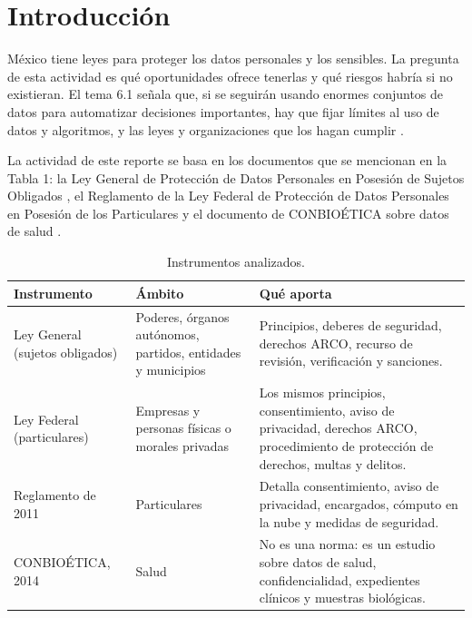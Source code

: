 \documentclass[11pt,letterpaper]{article}
\begin{document}
\portada
\indicegeneral

\section{Introducción}

México tiene leyes para proteger los datos personales y los sensibles. La pregunta de esta actividad es qué oportunidades ofrece tenerlas y qué riesgos habría si no existieran. El tema 6.1 señala que, si se seguirán usando enormes conjuntos de datos para automatizar decisiones importantes, hay que fijar límites al uso de datos y algoritmos, y las leyes y organizaciones que los hagan cumplir \parencite{iae_u6_t61}.

La actividad de este reporte se basa en los documentos que se mencionan en la Tabla 1: la Ley General de Protección de Datos Personales en Posesión de Sujetos Obligados \parencite{lgpdppso2025}, el Reglamento de la Ley Federal de Protección de Datos Personales en Posesión de los Particulares \parencite{reglamento2011} y el documento de CONBIOÉTICA sobre datos de salud \parencite{conbioetica2014}.

\begin{table}[H]
\centering
\scriptsize
\renewcommand{\arraystretch}{1.25}
\begin{tabularx}{\textwidth}{@{}p{3.2cm}p{3cm}X@{}}
\toprule
\textbf{Instrumento} & \textbf{Ámbito} & \textbf{Qué aporta} \\
\midrule
Ley General (sujetos obligados) \parencite{lgpdppso2025} & Poderes, órganos autónomos, partidos, entidades y municipios & Principios, deberes de seguridad, derechos ARCO, recurso de revisión, verificación y sanciones. \\
Ley Federal (particulares) \parencite{lfpdppp2025} & Empresas y personas físicas o morales privadas & Los mismos principios, consentimiento, aviso de privacidad, derechos ARCO, procedimiento de protección de derechos, multas y delitos. \\
Reglamento de 2011 \parencite{reglamento2011} & Particulares & Detalla consentimiento, aviso de privacidad, encargados, cómputo en la nube y medidas de seguridad. \\
CONBIOÉTICA, 2014 \parencite{conbioetica2014} & Salud & No es una norma: es un estudio sobre datos de salud, confidencialidad, expedientes clínicos y muestras biológicas. \\
\bottomrule
\end{tabularx}
\caption{Instrumentos analizados.}\label{tab:marco}
\end{table}
\end{document}
